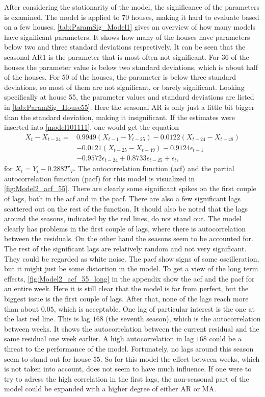 \noindent After considering the stationarity of the model, the significance of the parameters is examined. The model is applied to $70$ houses, making it hard to evaluate based on a few houses. \cref{tab:ParamSig_Model1} gives an overview of how many models have significant parameters. It shows how many of the houses have parameters below two and three standard deviations respectively. It can be seen that the seasonal AR1 is the parameter that is most often not significant. For $36$ of the houses the parameter value is below two standard deviations, which is about half of the houses. For $50$ of the houses, the parameter is below three standard deviations, so most of them are not significant, or barely significant. Looking specifically at house 55, the parameter values and standard deviations are listed in \cref{tab:ParamSig_House55}. Here the seasonal AR is only just a little bit bigger than the standard deviation, making it insignificant. If the estimates were inserted into \cref{model101111}, one would get the equation
\begin{align}
    X_t-X_{t-24} =& 0.9949 (X_{t-1}-Y_{t-25}) - 0.0122 (X_{t-24}-X_{t-48}) \nonumber\\  & - 0.0121  (X_{t-25}-X_{t-49}) - 0.9124 \epsilon_{t-1} \nonumber\\
    &-0.9572 \epsilon_{t-24} + 0.8733 \epsilon_{t-25} + \epsilon_t,
\end{align}
for $X_t = Y_t - 0.288 T'_T$. The autocorrelation function (acf) and the partial autocorrelation function (pacf) for this model is visualized in \cref{fig:Model2_acf_55}. There are clearly some significant spikes on the first couple of lags, both in the acf and in the pacf. There are also a few significant lags scattered out on the rest of the function. It should also be noted that the lags around the seasons, indicated by the red lines, do not stand out. The model clearly has problems in the first couple of lags, where there is autocorrelation between the residuals. On the other hand the seasons seem to be accounted for. The rest of the significant lags are relatively random and not very significant. They could be regarded as white noise. The pacf show signs of some oscilleration, but it might just be some distortion in the model. To get a view of the long term effects, \cref{fig:Model2_acf_55_long} in the appendix show the acf and the pacf for an entire week. Here it is still clear that the model is far from perfect, but the biggest issue is the first couple of lags. After that, none of the lags reach more than about $0.05$, which is acceptable. One lag of particular interest is the one at the last red line. This is lag $168$ (the seventh season), which is the autocorrelation between weeks. It shows the autocorrelation between the current residual and the same residual one week earlier. A high autocorrelation in lag $168$ could be a threat to the performance of the model. Fortunately, no lags around this season seem to stand out for house $55$. So for this model the effect between weeks, which is not taken into account, does not seem to have much influence. If one were to try to adress the high correlation in the first lags, the non-seasonal part of the model could be expanded with a higher degree of either AR or MA.


